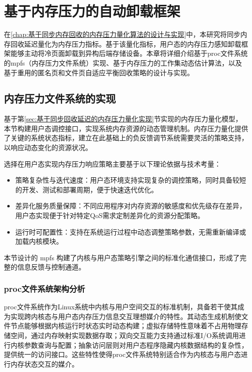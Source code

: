 \chapter{基于内存压力的自动卸载框架}
\label{chap:基于内存压力的自动卸载框架}

在\ref{chap:基于同步内存回收的内存压力量化算法的设计与实现}中，本研究将同步内存回收延迟量化为内存压力指标。基于该量化指标，用户态的内存压力感知卸载框架能够主动将冷页面卸载到异构后端存储设备。本章将详细介绍基于proc文件系统的mpfs（内存压力文件系统）实现、基于内存压力的工作集动态估计算法，以及基于重用的匿名页和文件页自适应平衡回收策略的设计与实现。




\section{内存压力文件系统的实现}
\label{sec:mpfs_implementation}

基于第\ref{sec:基于同步回收延迟的内存压力量化实现}节实现的内存压力量化模型，本节构建用户态调控接口，实现系统内存资源的动态管理机制。内存压力量化提供了关键的系统状态指标，建立在此基础上的负反馈调节系统需要灵活的策略支持，以响应动态变化的资源状况。

选择在用户态实现内存压力响应策略主要基于以下理论依据与技术考量：

\begin{itemize}
    \item 策略复杂性与迭代速度：用户态环境支持实现复杂的调控策略，同时具备较短的开发、测试和部署周期，便于快速迭代优化。
    \item 差异化服务质量保障：不同应用程序对内存资源的敏感度和优先级存在差异，用户态实现便于针对特定QoS需求定制差异化的资源分配策略。
    \item 运行时可配置性：支持在系统运行过程中动态调整策略参数，无需重新编译或加载内核模块。
\end{itemize}

本节设计的 mpfs 构建了内核与用户态策略引擎之间的标准化通信接口，形成了完整的信息反馈与控制通道。

\subsection{proc文件系统架构分析}

proc文件系统作为Linux系统中内核与用户空间交互的标准机制，具备若干使其成为实现跨内核态与用户态内存压力信息交互理想媒介的特性。其动态生成机制使文件节点能够根据内核运行时状态实时动态构建；虚拟存储特性意味着不占用物理存储空间，通过内存映射实现数据存取；双向交互能力支持通过标准I/O系统调用进行内核参数查询与配置；抽象访问层则对用户态程序隐藏内核数据结构的复杂性，提供统一的访问接口。这些特性使得proc文件系统特别适合作为内核态与用户态进行内存状态交互的媒介。


